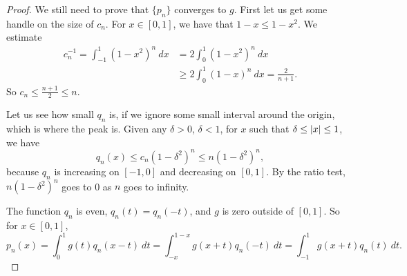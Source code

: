 \begin{proof}
We still need to prove that $\{ p_n \}$ converges to $g$.  First let us
get some handle on the size of $c_n$.
For $x \in [0,1]$, we have that $1-x \leq 1-x^2$.  We estimate
\begin{equation*}
\begin{split}
c_n^{-1}   = \int_{-1}^1 {(1-x^2)}^n ~ dx
& = 2\int_0^1 {(1-x^2)}^n ~ dx \\
& \geq 2\int_0^{1} {(1-x)}^n ~ dx
= \frac{2}{n+1} .
\end{split}
\end{equation*}
So $c_n \leq \frac{n+1}{2} \leq n$.

Let us see how small $q_n$ is, if we ignore some small interval around the origin,
which is where the peak is.
Given any $\delta > 0$, $\delta < 1$, for
$x$ such that $\delta \leq \lvert {x} \rvert \leq 1$, we have
\begin{equation*}
q_n(x) \leq c_n {(1-\delta^2)}^n \leq  n{(1-\delta^2)}^n ,
\end{equation*}
because $q_n$ is increasing on $[-1,0]$ and decreasing on $[0,1]$.
By the ratio test, 
$n{(1-\delta^2)}^n$ goes to 0 as $n$ goes to infinity.

The function $q_n$ is even, $q_n(t) = q_n(-t)$, and $g$
is zero outside of $[0,1]$.
So for $x \in [0,1]$,
\begin{equation*}
p_n(x) = 
\int_{0}^1 g(t)q_n(x-t)  ~ dt
=
\int_{-x}^{1-x} g(x+t)q_n(-t)  ~ dt
=
\int_{-1}^{1} g(x+t)q_n(t)  ~ dt .
\end{equation*}


\end{proof}
